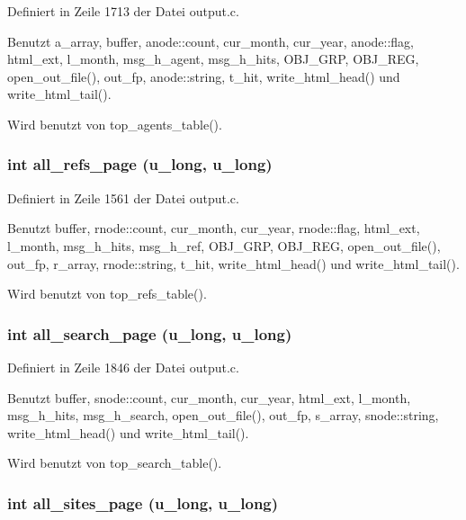 Definiert in Zeile 1713 der Datei output.c.

Benutzt a\_\-array, buffer, anode::count, cur\_\-month, cur\_\-year, anode::flag, html\_\-ext, l\_\-month, msg\_\-h\_\-agent, msg\_\-h\_\-hits, OBJ\_\-GRP, OBJ\_\-REG, open\_\-out\_\-file(), out\_\-fp, anode::string, t\_\-hit, write\_\-html\_\-head() und write\_\-html\_\-tail().

Wird benutzt von top\_\-agents\_\-table().
\subsubsection{\setlength{\rightskip}{0pt plus 5cm}int all\_\-refs\_\-page (u\_\-long, u\_\-long)}\label{output_8c_ffa5d4248e6a8d3946f094e5a16c026e}




Definiert in Zeile 1561 der Datei output.c.

Benutzt buffer, rnode::count, cur\_\-month, cur\_\-year, rnode::flag, html\_\-ext, l\_\-month, msg\_\-h\_\-hits, msg\_\-h\_\-ref, OBJ\_\-GRP, OBJ\_\-REG, open\_\-out\_\-file(), out\_\-fp, r\_\-array, rnode::string, t\_\-hit, write\_\-html\_\-head() und write\_\-html\_\-tail().

Wird benutzt von top\_\-refs\_\-table().
\subsubsection{\setlength{\rightskip}{0pt plus 5cm}int all\_\-search\_\-page (u\_\-long, u\_\-long)}\label{output_8c_b218b4268390f2e5c00ef1f303d3baad}




Definiert in Zeile 1846 der Datei output.c.

Benutzt buffer, snode::count, cur\_\-month, cur\_\-year, html\_\-ext, l\_\-month, msg\_\-h\_\-hits, msg\_\-h\_\-search, open\_\-out\_\-file(), out\_\-fp, s\_\-array, snode::string, write\_\-html\_\-head() und write\_\-html\_\-tail().

Wird benutzt von top\_\-search\_\-table().
\subsubsection{\setlength{\rightskip}{0pt plus 5cm}int all\_\-sites\_\-page (u\_\-long, u\_\-long)}\label{output_8c_c4e6c9fc2562755c38403dd45bdab4e9}




